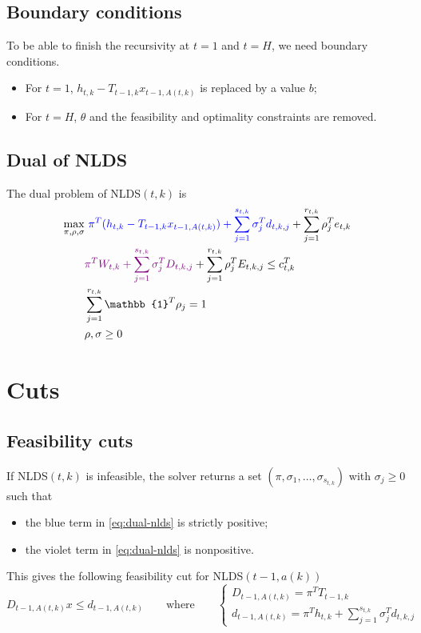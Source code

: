 \documentclass[12pt, openany]{report}
\theoremstyle{definition}
\begin{document}
\subsection{Boundary conditions}
To be able to finish the recursivity at $t=1$ and $t=H$, we need boundary conditions. 
\begin{itemize}
	\item For $t=1$, $h_{t,k}-T_{t-1, k}x_{t-1, A(t,k)}$ is replaced by a value $b$;
	\item For $t=H$, $\theta$ and the feasibility and optimality constraints are removed.
\end{itemize}
\subsection{Dual of NLDS}
The dual problem of NLDS$(t,k)$ is 
\begin{equation}\label{eq:dual-nlds}
	\begin{aligned}
		\max_{\pi,\rho,\sigma}&\ \textcolor{blue}{\pi^T(h_{t,k} - T_{t-1,k}x_{t-1, A(t,k)}) + \sum_{j=1}^{s_{t,k}} \sigma_j^T d_{t,k,j}}+ \sum_{j=1}^{r_{t,k}} \rho_j^T e_{t,k}\\
		& \textcolor{violet}{\pi^T W_{t,k} + \sum_{j=1}^{s_{t,k}} \sigma_j^T D_{t,k,j}} + \sum_{j=1}^{r_{t,k}} \rho_j^T E_{t,k,j} \le c_{t,k}^T\\
		& \sum_{j=1}^{r_{t,k}} \mathbb{1}^T \rho_j = 1\\
		&\rho, \sigma \ge 0
	\end{aligned}
\end{equation}
\section{Cuts}
\subsection{Feasibility cuts}
If NLDS$(t,k)$ is infeasible, the solver returns a set $(\pi, \sigma_1, \dots, \sigma_{s_{t,k}})$ with $\sigma_j \ge 0$ such that 
\begin{itemize}
	\item the blue term in \eqref{eq:dual-nlds} is strictly positive;
	\item the violet term in \eqref{eq:dual-nlds} is nonpositive.
\end{itemize}
This gives the following feasibility cut for NLDS$(t-1, a(k))$
\begin{equation}
	D_{t-1, A(t,k)} x\le d_{t-1, A(t,k)} \qquad \text{where} \qquad \begin{cases}
		D_{t-1, A(t,k)} = \pi^T T_{t-1,k}\\
		d_{t-1, A(t,k)} = \pi^Th_{t,k} +\sum_{j=1}^{s_{t,k}} \sigma_j^T d_{t,k,j}
	\end{cases}
\end{equation}
\end{document}
